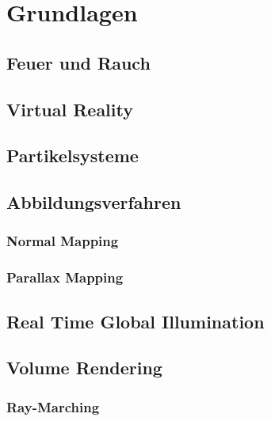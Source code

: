\section{Grundlagen}
\subsection{Feuer und Rauch}
\subsection{Virtual Reality}
\subsection{Partikelsysteme}
\subsection{Abbildungsverfahren}
\subsubsection{Normal Mapping}
\subsubsection{Parallax Mapping}
\subsection{Real Time Global Illumination}
\subsection{Volume Rendering}
\subsubsection{Ray-Marching}


\newpage
